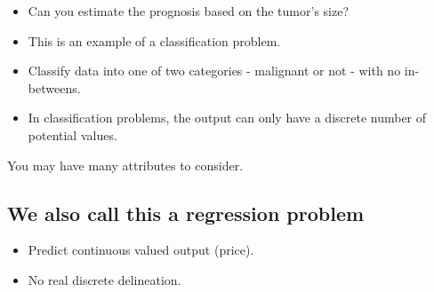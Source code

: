 \documentclass{article}
\begin{document}
\begin{itemize}
  \item Can you estimate the prognosis based on the tumor's size?
  \item This is an example of a classification problem.
  \item Classify data into one of two categories - malignant or not - with no in-betweens.
  \item In classification problems, the output can only have a discrete number of potential values.
\end{itemize}

You may have many attributes to consider.

\subsection*{We also call this a regression problem}
\begin{itemize}
  \item Predict continuous valued output (price).
  \item No real discrete delineation.
\end{itemize}
\end{document}
